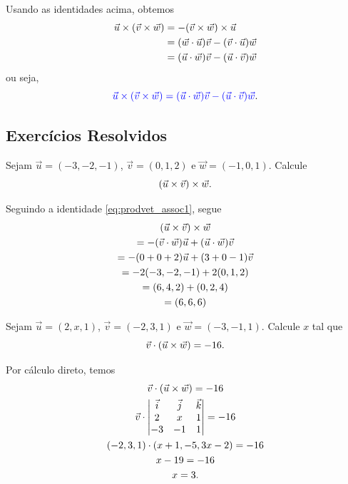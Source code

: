 Usando as identidades acima, obtemos
\begin{align}\label{eq:prodvet_assoc1}
  \vec{u}\times(\vec{v}\times\vec{w}) &= -(\vec{v}\times\vec{w})\times\vec{u}\\
                                    &= (\vec{w}\cdot\vec{u})\vec{v}-(\vec{v}\cdot\vec{u})\vec{w}\\
                                    &= (\vec{u}\cdot\vec{w})\vec{v}-(\vec{u}\cdot\vec{v})\vec{w}
\end{align}
ou seja,
\begin{equation}
  {\color{blue}\vec{u}\times(\vec{v}\times\vec{w}) = (\vec{u}\cdot\vec{w})\vec{v}-(\vec{u}\cdot\vec{v})\vec{w}}.
\end{equation}

\subsection{Exercícios Resolvidos}

\begin{exeresol}
  Sejam $\vec{u}=(-3,-2,-1)$, $\vec{v}=(0,1,2)$ e $\vec{w}=(-1,0,1)$. Calcule
  \begin{equation}
    (\vec{u}\times\vec{v})\times\vec{w}.
  \end{equation}
\end{exeresol}
\begin{resol}
  Seguindo a identidade \eqref{eq:prodvet_assoc1}, segue
  \begin{gather}
    (\vec{u}\times\vec{v})\times\vec{w} \\
    = -(\vec{v}\cdot\vec{w})\vec{u} + (\vec{u}\cdot\vec{w})\vec{v}\\
    = -(0+0+2)\vec{u} + (3+0-1)\vec{v}\\
    = -2(-3,-2,-1)+2(0,1,2)\\
    = (6,4,2)+(0,2,4)\\
    = (6,6,6)
  \end{gather}
\end{resol}


\begin{exeresol}
  Sejam $\vec{u}=(2,x,1)$, $\vec{v}=(-2,3,1)$ e $\vec{w}=(-3,-1,1)$. Calcule $x$ tal que
  \begin{equation}
    \vec{v}\cdot(\vec{u}\times\vec{w})=-16.
  \end{equation}
\end{exeresol}
\begin{resol}
  Por cálculo direto, temos
  \begin{gather}
    \vec{v}\cdot(\vec{u}\times\vec{w})=-16\\
    \vec{v}\cdot
    \begin{vmatrix}
      \vec{i} & \vec{j} & \vec{k}\\
      2 & x & 1 \\
      -3 & -1 & 1
    \end{vmatrix} = -16 \\
    (-2,3,1)\cdot(x+1,-5,3x-2)=-16\\
    x-19 = -16 \\
    x = 3.
  \end{gather}
\end{resol}

